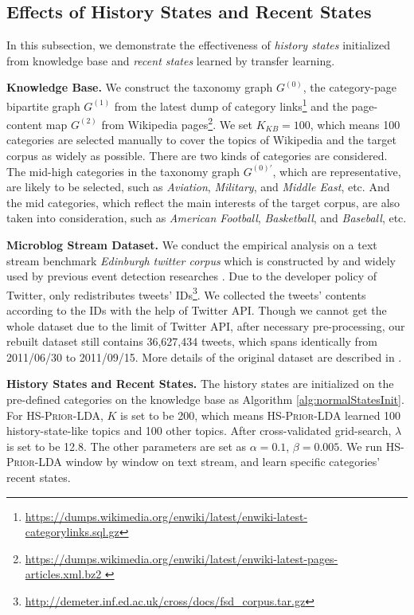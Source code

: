 \documentclass[runningheads,a4paper]{llncs}
\begin{document}
\subsection{Effects of History States and Recent States}
In this subsection, we demonstrate the effectiveness of \textit{history states} initialized from knowledge base and \textit{recent states} learned by transfer learning. 

\textbf{Knowledge Base.} 
We construct the taxonomy graph \(G^{(0)}\), the category-page bipartite graph \(G^{(1)}\) from the latest dump of category links\footnote{\url{https://dumps.wikimedia.org/enwiki/latest/enwiki-latest-categorylinks.sql.gz}} and the page-content map \(G^{(2)}\) from Wikipedia pages\footnote{\url{https://dumps.wikimedia.org/enwiki/latest/enwiki-latest-pages-articles.xml.bz2 }}.
We set \(K_{KB}=100\), which means 100 categories are selected manually to cover the topics of Wikipedia and the target corpus as widely as possible. 
There are two kinds of categories are considered. 
The mid-high categories in the taxonomy graph \(G^{(0)'}\), which are representative, are likely to be selected, such as \textit{Aviation}, \textit{Military}, and \textit{Middle East}, etc.
And the mid categories, which reflect the main interests of the target corpus, are also taken into consideration, such as \textit{American Football}, \textit{Basketball}, and \textit{Baseball}, etc. 

\textbf{Microblog Stream Dataset.} We conduct the empirical analysis on a text stream benchmark \textit{Edinburgh twitter corpus} which is constructed by \cite{petrovic2012using} and widely used by previous event detection researches \cite{petrovic2013can} \cite{Wurzer:2015wq}. 
Due to the developer policy of Twitter, \cite{petrovic2012using} only redistributes tweets' IDs\footnote{\url{http://demeter.inf.ed.ac.uk/cross/docs/fsd_corpus.tar.gz}}.
We collected the tweets' contents according to the IDs with the help of Twitter API. 
Though we cannot get the whole dataset due to the limit of Twitter API, after necessary pre-processing, our rebuilt dataset still contains 36,627,434 tweets, which spans identically from 2011/06/30 to 2011/09/15.
More details of the original dataset are described in \cite{petrovic2010edinburgh}.

\textbf{History States and Recent States.} 
The history states are initialized on the pre-defined categories on the knowledge base as Algorithm \ref{alg:normalStatesInit}.
For \textsc{HS-Prior-LDA}, \(K\) is set to be 200, which means \textsc{HS-Prior-LDA} learned 100 history-state-like topics and 100 other topics.
After cross-validated grid-search, \(\lambda\) is set to be 12.8. The other parameters are set as \(\alpha=0.1\), \(\beta=0.005\).
We run \textsc{HS-Prior-LDA} window by window on text stream, and learn specific categories' recent states.
\end{document}
